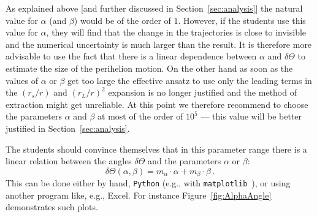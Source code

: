 \documentclass[12pt,ngerman,american]{iopart}
\newcommand{\python}[0]{\texttt{Python}}
\begin{document}
As explained above [and further discussed in Section~\ref{sec:analysis}] the natural value for $\alpha$ (and $\beta$)  would be of the order of $1$.
However, if the students use this value for $\alpha$, they will find that the change in the trajectories is close to invisible and the numerical uncertainty is much larger than the result.
It is therefore more advisable to use the fact that there is a linear dependence between $\alpha$ and $\delta \Theta$ to estimate the size of the perihelion motion.
On the other hand as soon as the values of $\alpha$ or $\beta$ get too large the effective ansatz to use only the leading terms
in the $(r_s/r)$ and $(r_L/r)^2$ expansion is no longer justified and the method of extraction might get unreliable.
At this point we therefore recommend to choose the parameters  $\alpha$ and $\beta$ at most of the order of $10^5$ --- this
value will be better justified in Section~\ref{sec:analysis}.

The students should convince themselves that in this parameter range there is a linear relation between the angles $\delta \Theta$ and the parameters $\alpha$ or $\beta$:
\begin{equation}\label{eq:theta-linear}
	\delta\Theta (\alpha, \beta) = m_\alpha \cdot \alpha + m_\beta \cdot \beta
	\, .
\end{equation}
This can be done either by hand, \python{} (e.g., with \texttt{matplotlib}~\cite{Matplotlib}), or using another program like, e.g., Excel.
For instance Figure~\ref{fig:AlphaAngle} demonstrates such plots.
\end{document}
